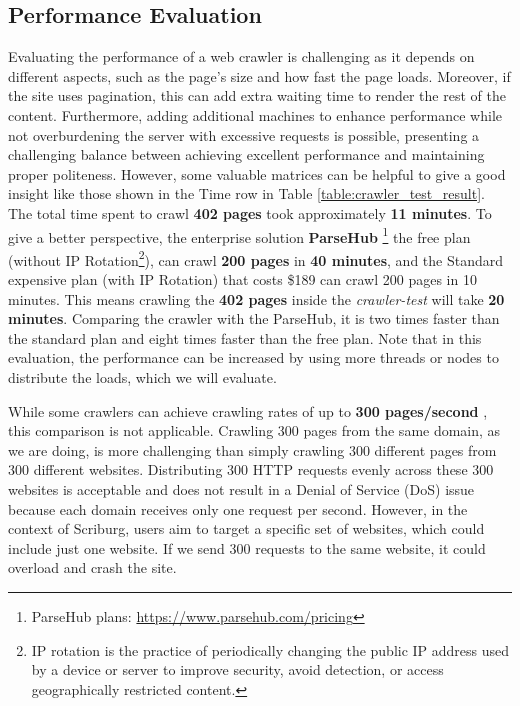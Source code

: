 {\subsection*{Performance Evaluation}
Evaluating the performance of a web crawler is challenging as it depends on different aspects, such as the page's size and how fast the page loads. Moreover, if the site uses pagination, this can add extra waiting time to render the rest of the content. Furthermore, adding additional machines to enhance performance while not overburdening the server with excessive requests is possible, presenting a challenging balance between achieving excellent performance and maintaining proper politeness. However, some valuable matrices can be helpful to give a good insight like those shown in the Time row in Table \ref{table:crawler_test_result}. The total time spent to crawl \textbf{402 pages} took approximately \textbf{11 minutes}. To give a better perspective, the enterprise solution \textbf{ParseHub} \footnote{ParseHub plans: \url{https://www.parsehub.com/pricing}} the free plan (without IP Rotation\footnote{IP rotation is the practice of periodically changing the public IP address used by a device or server to improve security, avoid detection, or access geographically restricted content.}), can crawl \textbf{200 pages} in \textbf{40 minutes}, and the Standard expensive plan (with IP Rotation) that costs \$189 can crawl 200 pages in 10 minutes. This means crawling the \textbf{402 pages} inside the \textit{crawler-test} will take \textbf{20 minutes}. Comparing the crawler with the ParseHub, it is two times faster than the standard plan and eight times faster than the free plan. Note that in this evaluation, the performance can be increased by using more threads or nodes to distribute the loads, which we will evaluate. 


While some crawlers can achieve crawling rates of up to \textbf{300 pages/second} \cite{shkapenyuk2002design}, this comparison is not applicable. Crawling 300 pages from the same domain, as we are doing, is more challenging than simply crawling 300 different pages from 300 different websites. Distributing 300 HTTP requests evenly across these 300 websites is acceptable and does not result in a Denial of Service (DoS) issue because each domain receives only one request per second. However, in the context of Scriburg, users aim to target a specific set of websites, which could include just one website. If we send 300 requests to the same website, it could overload and crash the site.

}
